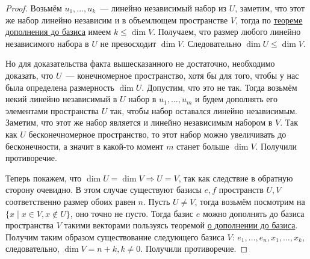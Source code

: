 \begin{proof}
    Возьмём $u_1,\dots,u_k$~--- линейно независимый набор из $U$, заметим,
    что этот же набор линейно независим и в объемлющем пространстве $V$, тогда
    по \hyperref[thm:О дополнении до базиса]{теореме дополнения до базиса}
    имеем $k \le \dim V$. Получаем, что размер любого линейно независимого набора в $U$
    не превосходит $\dim V$. Следовательно $\dim U \le \dim V$.

    Но для доказательства факта вышесказанного не достаточно, необходимо доказать,
    что $U$~--- конечномерное пространство, хотя бы для того, чтобы у нас была определена
    размерность $\dim U$. Допустим, что это не так.
    Тогда возьмём некий линейно независимый в $U$ набор в $u_1,\dots, u_m$ и будем 
    дополнять его элементами пространства $U$ так, чтобы набор оставался линейно независимым.
    Заметим, что этот же набор является и линейно независимым набором в $V$.
    Так как $U$ бесконечномерное пространство, то этот набор можно увеличивать до бесконечности,
    а значит в какой-то момент $m$ станет больше $\dim V$. 
    Получили противоречие.

    Теперь покажем, что $\dim U = \dim V \Rightarrow U = V$,
    так как следствие в обратную сторону очевидно. В этом случае существуют базисы
    $e, f$ пространств $U, V$ соответственно размер обоих равен $n$. Пусть $U \neq V$,
    тогда возьмём посмотрим на $\{x \mid x \in V, x \not\in U\}$, оно точно не пусто.
    Тогда базис $e$ можно дополнять до базиса пространства $V$ такими векторами пользуясь теоремой
    \hyperref[thm:О дополнении до базиса]{о дополнении до базиса}. Получим таким образом
    существование следующего базиса $V$: $e_1,\dots,e_n,x_1,\dots,x_k$, следовательно,
    $\dim V = n + k, k \neq 0$. Получили противоречие.
\end{proof}
